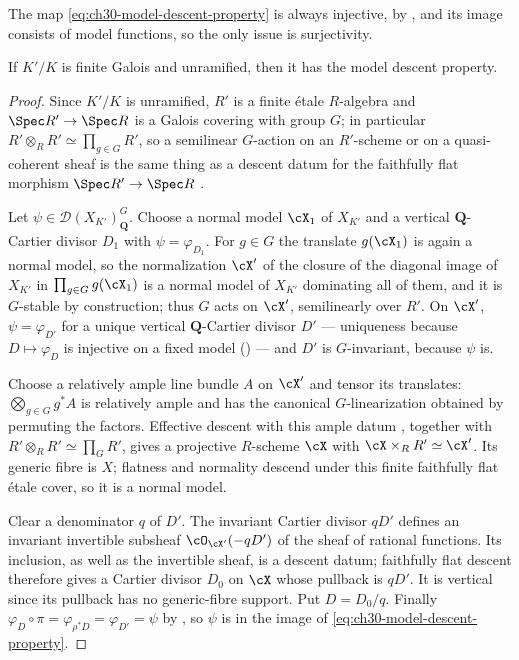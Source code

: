 The map \eqref{eq:ch30-model-descent-property} is always injective, by
, and its image consists of model
functions, so the only issue is surjectivity.

\begin{theorem}
\label{thm:ch30-model-descent}
If $K'/K$ is finite Galois and unramified, then it has the model descent
property.
\end{theorem}

\begin{proof}
Since $K'/K$ is unramified, $R'$ is a finite étale $R$-algebra and
$\Spec R'\to\Spec R$ is a Galois covering with group $G$; in
particular $R'\otimes_RR'\simeq\prod_{g\in G}R'$, so a semilinear
$G$-action on an $R'$-scheme or on a quasi-coherent sheaf is the same
thing as a descent datum for the faithfully flat morphism
$\Spec R'\to\Spec R$ \cite[Exp.~VIII]{SGA1}.

Let $\psi\in\mathcal D(X_{K'})_{\mathbf Q}^G$.  Choose a normal model
$\cX_1$ of $X_{K'}$ and a vertical $\mathbf Q$-Cartier divisor
$D_1$ with $\psi=\varphi_{D_1}$.  For $g\in G$ the translate
$g(\cX_1)$ is again a normal model, so the normalization $\cX'$ of the
closure of the diagonal image of $X_{K'}$ in
$\prod_{g\in G}g(\cX_1)$ is a normal model of $X_{K'}$ dominating all
of them, and it is $G$-stable by construction; thus $G$ acts on
$\cX'$, semilinearly over $R'$.  On $\cX'$, $\psi=\varphi_{D'}$ for
a unique vertical $\mathbf Q$-Cartier divisor $D'$ --- uniqueness
because $D\mapsto\varphi_D$ is injective on a fixed model
() --- and $D'$ is $G$-invariant,
because $\psi$ is.

Choose a relatively ample line bundle $A$ on $\cX'$ and tensor its
translates: $\bigotimes_{g\in G}g^*A$ is relatively ample and has the
canonical $G$-linearization obtained by permuting the factors.
Effective descent with this ample datum
\cite[Exp.~VIII, Proposition~7.8 and Corollary~5.8]{SGA1}, together with
$R'\otimes_RR'\simeq\prod_GR'$, gives a projective $R$-scheme $\cX$
with $\cX\times_RR'\simeq\cX'$.
Its generic fibre is $X$; flatness and normality descend under this
finite faithfully flat étale cover, so it is a normal model.

Clear a denominator $q$ of $D'$.  The invariant Cartier divisor $qD'$
defines an invariant invertible subsheaf
$\cO_{\cX'}(-qD')$ of the sheaf of rational functions.  Its inclusion,
as well as the invertible sheaf, is a descent datum; faithfully flat
descent \cite[Exp.~VIII, Theorem~1.1]{SGA1} therefore gives a Cartier divisor $D_0$ on $\cX$ whose pullback
is $qD'$.  It is vertical since its pullback has no generic-fibre
support.  Put $D=D_0/q$.  Finally $\varphi_D\circ\pi=\varphi_{\rho^*D}=\varphi_{D'}=\psi$
by , so $\psi$ is in the image
of \eqref{eq:ch30-model-descent-property}.
\end{proof}

